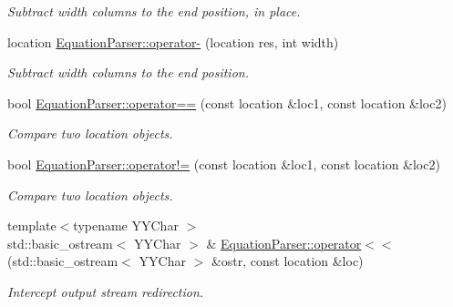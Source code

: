 \begin{DoxyCompactItemize}
\begin{DoxyCompactList}\small\item\em Subtract {\itshape width} columns to the end position, in place. \end{DoxyCompactList}\item 
location \hyperlink{location_8hh_a63a349232174befa3d2bb9ad28c776e7}{Equation\+Parser\+::operator-\/} (location res, int width)\hypertarget{location_8hh_a63a349232174befa3d2bb9ad28c776e7}{}\label{location_8hh_a63a349232174befa3d2bb9ad28c776e7}

\begin{DoxyCompactList}\small\item\em Subtract {\itshape width} columns to the end position. \end{DoxyCompactList}\item 
bool \hyperlink{location_8hh_ae6d0b523f7673c8da176a4c94e8278ae}{Equation\+Parser\+::operator==} (const location \&loc1, const location \&loc2)\hypertarget{location_8hh_ae6d0b523f7673c8da176a4c94e8278ae}{}\label{location_8hh_ae6d0b523f7673c8da176a4c94e8278ae}

\begin{DoxyCompactList}\small\item\em Compare two location objects. \end{DoxyCompactList}\item 
bool \hyperlink{location_8hh_a83d9eab30473390a2c1bd6c8d9e0161b}{Equation\+Parser\+::operator!=} (const location \&loc1, const location \&loc2)\hypertarget{location_8hh_a83d9eab30473390a2c1bd6c8d9e0161b}{}\label{location_8hh_a83d9eab30473390a2c1bd6c8d9e0161b}

\begin{DoxyCompactList}\small\item\em Compare two location objects. \end{DoxyCompactList}\item 
{\footnotesize template$<$typename Y\+Y\+Char $>$ }\\std\+::basic\+\_\+ostream$<$ Y\+Y\+Char $>$ \& \hyperlink{location_8hh_acad9fad3affdce34c0a30e675ce90753}{Equation\+Parser\+::operator$<$$<$} (std\+::basic\+\_\+ostream$<$ Y\+Y\+Char $>$ \&ostr, const location \&loc)
\begin{DoxyCompactList}\small\item\em Intercept output stream redirection. \end{DoxyCompactList}\end{DoxyCompactItemize}


